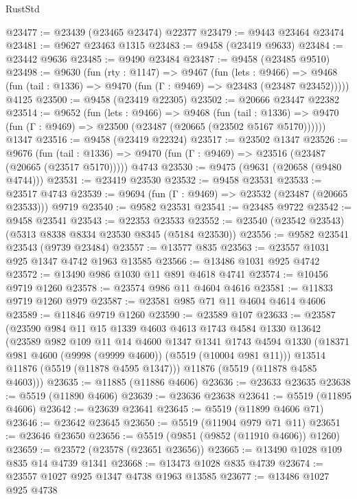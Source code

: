 \begin{lexlean}{RustStd}
\begin{coremodule}
@23477 := @23439 (@23465 @23474) @22377
@23479 := @9443 @23464 @23474
@23481 := @9627 @23463 @1315
@23483 := @9458 (@23419 @9633)
@23484 := @23442 @9636
@23485 := @9490 @23484
@23487 := @9458 (@23485 @9510)
@23498 := @9630
    (fun (rty : @1147) =>
    @9467
      (fun (lets : @9466) =>
      @9468 (fun (tail : @1336) => @9470 (fun (Γ : @9469) => @23483 (@23487 @23452)))))
    @4125
@23500 := @9458 (@23419 @22305)
@23502 := @20666 @23447 @22382
@23514 := @9652
    (fun (lets : @9466) =>
    @9468
      (fun (tail : @1336) =>
      @9470 (fun (Γ : @9469) => @23500 (@23487 (@20665 (@23502 @5167 @5170))))))
    @1347
@23516 := @9458 (@23419 @22324)
@23517 := @23502 @1347
@23526 := @9676
    (fun (tail : @1336) => @9470 (fun (Γ : @9469) => @23516 (@23487 (@20665 (@23517 @5170)))))
    @4743
@23530 := @9475 (@9631 (@20658 (@9480 @4744)))
@23531 := @23419 @23530
@23532 := @9458 @23531
@23533 := @23517 @4743
@23539 := @9694 (fun (Γ : @9469) => @23532 (@23487 (@20665 @23533))) @9719
@23540 := @9582 @23531
@23541 := @23485 @9722
@23542 := @9458 @23541
@23543 := @22353 @23533
@23552 := @23540 (@23542 @23543) (@5313 @8338 @8334 @23530 @8345 (@5184 @23530))
@23556 := @9582 @23541 @23543 (@9739 @23484)
@23557 := @13577 @835
@23563 := @23557 @1031 @925 @1347 @4742 @1963 @13585
@23566 := @13486 @1031 @925 @4742
@23572 := @13490 @986 @1030 @11 @891 @4618 @4741
@23574 := @10456 @9719 @1260
@23578 := @23574 @986 @11 @4604 @4616
@23581 := @11833 @9719 @1260 @979
@23587 := @23581 @985 @71 @11 @4604 @4614 @4606
@23589 := @11846 @9719 @1260
@23590 := @23589 @107
@23633 := @23587
    (@23590
      @984
      @11
      @15
      @1339
      @4603
      @4613
      @1743
      @4584
      @1330
      @13642
      (@23589
        @982
        @109
        @11
        @14
        @4600
        @1347
        @1341
        @1743
        @4594
        @1330
        (@18371 @981 @4600 (@9998 (@9999 @4600)) (@5519 (@10004 @981 @11)))
        @13514
        @11876
        (@5519 (@11878 @4595 @1347)))
      @11876
      (@5519 (@11878 @4585 @4603)))
@23635 := @11885 (@11886 @4606)
@23636 := @23633 @23635
@23638 := @5519 (@11890 @4606)
@23639 := @23636 @23638
@23641 := @5519 (@11895 @4606)
@23642 := @23639 @23641
@23645 := @5519 (@11899 @4606 @71)
@23646 := @23642 @23645
@23650 := @5519 (@11904 @979 @71 @11)
@23651 := @23646 @23650
@23656 := @5519 (@9851 (@9852 (@11910 @4606)) @1260)
@23659 := @23572 (@23578 (@23651 @23656))
@23665 := @13490 @1028 @109 @835 @14 @4739 @1341
@23668 := @13473 @1028 @835 @4739
@23674 := @23557 @1027 @925 @1347 @4738 @1963 @13585
@23677 := @13486 @1027 @925 @4738

\end{coremodule}
\end{lexlean}
